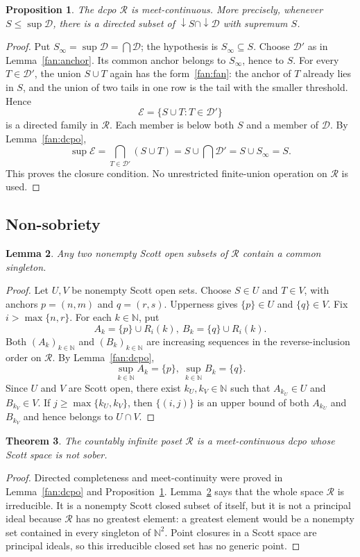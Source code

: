 \documentclass[10pt,a4paper]{article}
\newtheorem{theorem}{Theorem}[section]
\newtheorem{lemma}[theorem]{Lemma}
\newtheorem{proposition}[theorem]{Proposition}
\theoremstyle{definition}
\newcommand{\N}{\mathbb N}
\newcommand{\RR}{\mathcal R}
\begin{document}
\begin{proposition}\label{fan:mc}
The dcpo $\RR$ is meet-continuous. More precisely, whenever $S\leq\sup\mathcal D$, there is a directed subset of ${\downarrow} S\cap{\downarrow}\mathcal D$ with supremum $S$.
\end{proposition}
\begin{proof}
Put $S_\infty=\sup\mathcal D=\bigcap\mathcal D$; the hypothesis is $S_\infty\subseteq S$. Choose $\mathcal D'$ as in Lemma~\ref{fan:anchor}. Its common anchor belongs to $S_\infty$, hence to $S$. For every $T\in\mathcal D'$, the union $S\cup T$ again has the form~\eqref{fan:fan}: the anchor of $T$ already lies in $S$, and the union of two tails in one row is the tail with the smaller threshold. Hence
\[
 \mathcal E=\{S\cup T:T\in\mathcal D'\}
\]
is a directed family in $\RR$. Each member is below both $S$ and a member of $\mathcal D$. By Lemma~\ref{fan:dcpo},
\[
 \sup\mathcal E
 =\bigcap_{T\in\mathcal D'}(S\cup T)
 =S\cup\bigcap\mathcal D'
 =S\cup S_\infty=S.
\]
This proves the closure condition. No unrestricted finite-union operation on $\RR$ is used.
\end{proof}

\subsection{Non-sobriety}
\begin{lemma}\label{fan:irr}
Any two nonempty Scott open subsets of $\RR$ contain a common singleton.
\end{lemma}
\begin{proof}
Let $U,V$ be nonempty Scott open sets. Choose $S\in U$ and $T\in V$, with anchors $p=(n,m)$ and $q=(r,s)$. Upperness gives $\{p\}\in U$ and $\{q\}\in V$. Fix $i>\max\{n,r\}$. For each $k\in\N$, put
\[
 A_k=\{p\}\cup R_i(k),
 ~
 B_k=\{q\}\cup R_i(k).
\]
Both $(A_k)_{k\in\N}$ and $(B_k)_{k\in\N}$ are increasing sequences in the reverse-inclusion order on $\RR$. By Lemma~\ref{fan:dcpo},
\[
 \sup_{k\in\N}A_k=\{p\},
 ~
 \sup_{k\in\N}B_k=\{q\}.
\]
Since $U$ and $V$ are Scott open, there exist $k_U,k_V\in\N$ such that $A_{k_U}\in U$ and $B_{k_V}\in V$. If $j\geq\max\{k_U,k_V\}$, then $\{(i,j)\}$ is an upper bound of both $A_{k_U}$ and $B_{k_V}$ and hence belongs to $U\cap V$.
\end{proof}

\begin{theorem}\label{fan:main}
The countably infinite poset $\RR$ is a meet-continuous dcpo whose Scott space is not sober.
\end{theorem}
\begin{proof}
Directed completeness and meet-continuity were proved in Lemma~\ref{fan:dcpo} and Proposition~\ref{fan:mc}. Lemma~\ref{fan:irr} says that the whole space $\RR$ is irreducible. It is a nonempty Scott closed subset of itself, but it is not a principal ideal because $\RR$ has no greatest element: a greatest element would be a nonempty set contained in every singleton of $\N^2$. Point closures in a Scott space are principal ideals, so this irreducible closed set has no generic point.
\end{proof}
\end{document}
